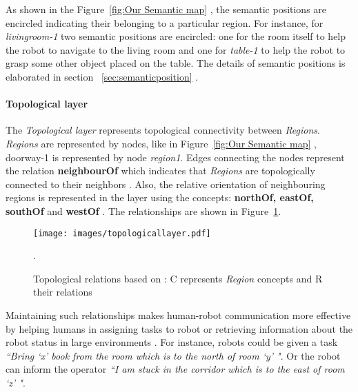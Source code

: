 As shown in the Figure~\ref{fig:Our Semantic map} , the semantic positions are encircled indicating their belonging to a particular region. For instance, for \textit{livingroom-1} two semantic positions are encircled: one for the room itself to help the robot to navigate to the living room 
and one for \textit{table-1} to help the robot to grasp some other object placed on the table. The details of semantic positions is elaborated in section ~\ref{sec:semanticposition} .

\paragraph{{Topological layer}}
The \textit{Topological layer} represents topological connectivity between \textit{Regions}.
\textit{Regions} are represented by nodes, like in Figure~\ref{fig:Our Semantic map} , doorway-1 is represented by node \textit{region1}. 
Edges connecting the nodes represent the relation \textbf{neighbourOf} which indicates that \textit{Regions} are topologically connected to their neighbors \cite{1}.
Also, the relative orientation of neighbouring regions is represented in the layer using the concepts: \textbf{northOf, eastOf, southOf} and \textbf{westOf} \cite{1}. The relationships are shown in Figure~\ref{fig:r}.  
\begin{figure}[htbp] %
   \centering
   \texttt{[image: images/topologicallayer.pdf]}
   \caption[Topological relations between regions based on \cite{1}]
   {Topological relations based on \cite{1}: C represents \textit{Region} concepts and R their relations}.
   \label{fig:r}
\end{figure}
Maintaining such relationships makes human-robot communication more effective by helping humans in assigning tasks to robot or retrieving information about the robot status in large environments \cite{8}.
For instance, robots could be given a task \textit{``Bring `x' book from the room which is to the north of room `y' "}.
Or the robot can inform the operator \textit{``I am stuck in the corridor which is to the east of room `z' "}.\\

